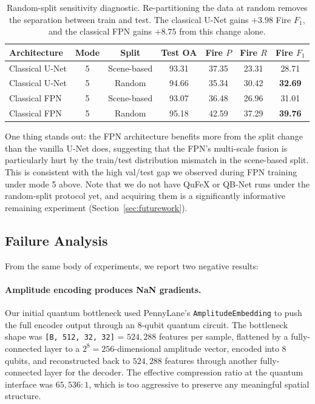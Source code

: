 \documentclass{article}
\begin{document}
\begin{table}[H]
    \centering
    \small
    \begin{tabular}{lcccccc}
        \toprule
        Architecture & Mode & Split & Test OA & Fire $P$ & Fire $R$ & Fire $F_1$ \\
        \midrule
        Classical U-Net   & 5 & Scene-based       & 93.31 & 37.35 & 23.31 & 28.71 \\
        Classical U-Net   & 5 & Random            & 94.66 & 35.34 & 30.42 & \textbf{32.69} \\
        Classical FPN     & 5 & Scene-based       & 93.07 & 36.48 & 26.96 & 31.01 \\
        Classical FPN     & 5 & Random            & 95.18 & 42.59 & 37.29 & \textbf{39.76} \\
        \bottomrule
    \end{tabular}
    \caption{Random-split sensitivity diagnostic. Re-partitioning the data at random removes the separation between train and test. The classical U-Net gains $+3.98$ Fire $F_1$, and the classical FPN gains $+8.75$ from this change alone.}
    \label{tab:random-split}
\end{table}

One thing stands out: the FPN architecture benefits more from the split change than the vanilla U-Net does, suggesting that the FPN's multi-scale fusion is particularly hurt by the train/test distribution mismatch in the scene-based split. This is consistent with the high val/test gap we observed during FPN training under mode 5 above. Note that we do not have QuFeX or QB-Net runs under the random-split protocol yet, and acquiring them is a significantly informative remaining experiment (Section~\ref{sec:futurework}).

\subsection{Failure Analysis}
\label{sec:failures}

From the same body of experiments, we report two negative results:

\paragraph{Amplitude encoding produces NaN gradients.}
Our initial quantum bottleneck used PennyLane's \texttt{AmplitudeEmbedding} to push the full encoder output through an 8-qubit quantum circuit. The bottleneck shape was \texttt{[B, 512, 32, 32]} = $524{,}288$ features per sample, flattened by a fully-connected layer to a $2^8 = 256$-dimensional amplitude vector, encoded into 8 qubits, and reconstructed back to $524{,}288$ features through another fully-connected layer for the decoder. The effective compression ratio at the quantum interface was $65{,}536{:}1$, which is too aggressive to preserve any meaningful spatial structure.
\end{document}
